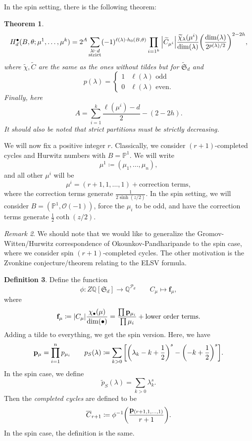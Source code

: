 \documentclass[leqno, openany]{memoir}
\newtheorem{thm}{Theorem}[section]
\theoremstyle{definition}
\newtheorem{defn}[thm]{Definition}
\theoremstyle{remark}
\newtheorem{rmk}[thm]{Remark}
\theoremstyle{plain}
\theoremstyle{definition}
\theoremstyle{remark}
\newcommand{\Q}{\mathbb{Q}}
\renewcommand{\P}{\mathbb{P}}
\newcommand{\mc}[1]{\mathcal{#1}}
\newcommand{\mf}[1]{\mathfrak{#1}}
\newcommand{\ol}[1]{\overline{#1}}
\newcommand{\wt}[1]{\widetilde{#1}}
\begin{document}
In the spin setting, there is the following theorem:

\begin{thm}
  \[ H_d^{\bullet}(B, \theta; \mu^1, \ldots,\mu^k) = 2^A \sum_{\substack{\lambda \vdash d \\ \text{strict}}} (-1)^{\ell(\lambda) \cdot h_0(B, \theta)} \prod_{i=1^k} \abs{\wt{C}_{\mu^i}} \frac{\wt{\chi}_{\lambda}(\mu^i)}{\dim(\lambda)} \qty(\frac{\dim(\lambda)}{2^{p(\lambda)/2}})^{2-2h}, \]
  where $\wt{\chi}, \wt{C}$ are the same as the ones without tildes but for $\wt{\mf{S}}_d$ and
  \[ p(\lambda) = \begin{cases}
                    1 & \ell(\lambda) \text{ odd} \\
                    0 & \ell(\lambda) \text{ even}.
                  \end{cases} \]
                Finally, here
                \[ A= \sum_{i=1}^k \frac{\ell(\mu^i) - d}{2} - (2-2h). \]
                It should also be noted that strict partitions must be strictly decreasing.
\end{thm}

We will now fix a positive integer $r$. Classically, we consider $(r+1)$-completed cycles and Hurwitz numbers with $B = \P^1$. We will write
\[ \mu^1 \coloneqq (\mu_1, \ldots, \mu_n), \]
and all other $\mu^i$ will be
\[ \mu^i = (r+1, 1, \ldots, 1) + \text{correction terms}, \]
where the correction terms generate $\frac{1}{2\sinh(z/2)}$. In the spin setting, we will consider $B = (\P^1, \mc{O}(-1))$, force the $\mu_i$ to be odd, and have the correction terms generate $\frac{1}{2} \coth(z/2)$.

\begin{rmk}
We should note that we would like to generalize the Gromov-Witten/Hurwitz correspondence of Okounkov-Pandharipande to the spin case, where we consider spin $(r+1)$-completed cycles. The other motivation is the Zvonkine conjecture/theorem relating to the ELSV formula.
\end{rmk}

\begin{defn}
  Define the function
  \[ \phi \colon Z \Q[\mf{S}_d] \to \Q^{\mc{P}_d} \qquad C_{\mu} \mapsto \mathbf{f}_{\mu}, \]
  where
  \[ \mathbf{f}_{\mu} \coloneqq \abs{C_{\mu}} \frac{\chi_{\bullet}(\mu)}{\dim(\bullet)} = \frac{\prod \mathbf{p}_{\mu_i}}{\prod \mu_i} + \text{lower order terms}. \]
  Adding a tilde to everything, we get the spin version. Here, we have
  \[ \mathbf{p}_{\mu} = \prod_{i=1}^n p_{\mu_i} \qquad p_S(\lambda) \coloneqq \sum_{k>0} \qty[\qty(\lambda_k-k+\frac{1}{2})^s - \qty(-k+\frac{1}{2})^s]. \]
  In the spin case, we define
  \[ \wt{p}_S(\lambda) = \sum_{k>0} \lambda_k^s. \]
  Then the \textit{completed cycles} are defined to be
  \[ \ol{C}_{r+1} \coloneqq \phi^{-1} \qty(\frac{\mathbf{p}_{(r+1,1,\ldots,1)}}{r+1}). \]
  In the spin case, the definition is the same.
\end{defn}
\end{document}
